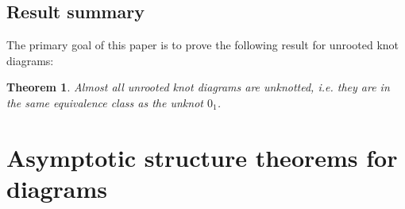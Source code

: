 \documentclass[amsmath,longbibliography,secnumarabic,floatfix,amssymb,nofootinbib,nobibnotes,letterpaper,11pt,tightenlines,notitlepage,showkeys,showlabels]{amsart}%
\newtheorem{theorem}{Theorem}
\newtheorem{corollary}[theorem]{Corollary}
\theoremstyle{definition}
\begin{document}





\subsection{Result summary}
\label{sec:result-summary}

The primary goal of this paper is to prove the following result for
unrooted knot diagrams:

\begin{theorem}
  Almost all unrooted knot diagrams are unknotted, i.e. they are in
  the same equivalence class as the unknot $0_1$.
\end{theorem}

\section{Asymptotic structure theorems for diagrams}
\label{sec:structure}
\end{document}
